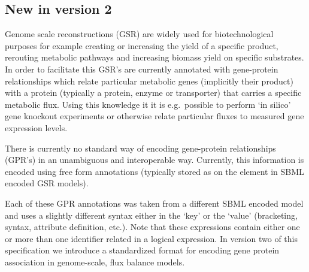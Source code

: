 \subsection{New in version 2}
\label{intro-ga}
Genome scale reconstructions (GSR) are widely used for biotechnological purposes for example creating or increasing the yield of a specific product, rerouting metabolic pathways and increasing biomass yield on specific substrates. In order to facilitate this GSR's are currently annotated with gene-protein relationships which relate particular metabolic genes (implicitly their product) with a protein (typically a protein, enzyme or transporter) that carries a specific metabolic flux. Using this knowledge it it is e.g.~possible to perform `in silico' gene knockout experiments or otherwise relate particular fluxes to measured gene expression levels.

There is currently no standard way of encoding gene-protein relationships (GPR's) in an unambiguous and interoperable way. Currently, this information is encoded using free form annotations (typically stored as \Notes on the \Reaction element in SBML encoded GSR models).
%

Each of these GPR annotations was taken from a different SBML encoded model and uses a slightly different syntax either in the `key' or the `value' (bracketing, syntax, attribute definition, etc.). Note that these expressions contain either one or more than one identifier related in a logical expression. In version two of this specification we introduce a standardized format for encoding gene protein association in genome-scale, flux balance models.

